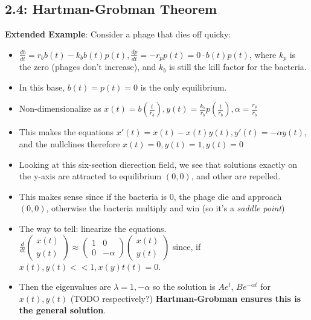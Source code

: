 \documentclass[11pt, oneside]{article}   	%
\begin{document}
\subsection{2.4: Hartman-Grobman Theorem}

\textbf{Extended Example}: Consider a phage that dies off quicky:
\begin{itemize}
\item $\frac{db}{dt} = r_bb(t)-k_bb(t)p(t), \frac{dp}{dt} = -r_pp(t) = 0 \cdot b(t)p(t)$, where $k_p$ is the zero (phages don't increase), and $k_b$ is still the kill factor for the bacteria.
\item In this base, $b(t) = p(t) = 0$ is the only equilibrium.
\item Non-dimensionalize as $x(t) = b(\frac{t}{r_b}), y(t) = \frac{k_b}{r_b}p(\frac{t}{r_b}), \alpha = \frac{r_p}{r_b}$
\item This makes the equations $x'(t) = x(t) - x(t)y(t), y'(t) = -\alpha y(t)$, and the nullclines therefore $x(t) = 0, y(t) = 1, y(t) = 0$
\item Looking at this six-section dierection field, we see that solutions exactly on the y-axis are attracted to equilibrium $(0,0)$, and other are repelled.
\item This makes sense since if the bacteria is 0, the phage die and approach $(0,0)$, otherwise the bacteria multiply and win (so it's a \emph{saddle point})
\item The way to tell: linearize the equations.  $\frac{d}{dt} \begin{pmatrix} x(t) \\ y(t) \end{pmatrix} \approx \begin{pmatrix} 1 & 0 \\ 0 & -\alpha \end{pmatrix}  \begin{pmatrix} x(t) \\ y(t) \end{pmatrix} $ since, if $x(t), y(t) << 1,  x(y)t(t) = 0$.  
\item Then the eigenvalues are $\lambda = 1, -\alpha$ so the solution is $Ae^t$,  $Be^{-\alpha t}$ for $x(t), y(t)$ (TODO respectively?) \textbf{Hartman-Grobman ensures this is the general solution}.
 \end{itemize}
\end{document}
